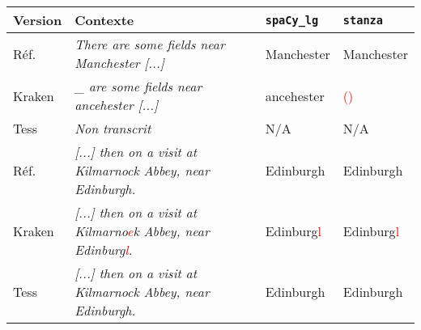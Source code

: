 \begin{tabular}{|l|p{7.5cm}|l|l|}

\hline

\bf{Version} & \bf {Contexte} & \bf{\texttt{spaCy\_lg}}&\bf{\texttt{stanza}}\\
\hline

Réf.\ &\textit{There are some fields near Manchester [...] }& Manchester &Manchester  \\

Kraken & \textit{\_ are some fields near ancehester [...]}& ancehester & \textcolor{red}{()} \\ 

Tess & \textit{Non transcrit} & N/A&N/A \\

\hline 
Réf.\ & \textit{[...] then on a visit at Kilmarnock Abbey, near
     Edinburgh.} & Edinburgh &Edinburgh \\
 Kraken &\textit{[...] then on a visit at Kilmarno\textcolor{red}{e}k Abbey, near
Edinburg\textcolor{red}{l}.} & Edinburg\textcolor{red}{l} & Edinburg\textcolor{red}{l}\\ 
 Tess &\textit{[...] then on a visit at Kilmarnock Abbey, near
Edinburgh. }& Edinburgh & Edinburgh \\


\hline 

\end{tabular}
